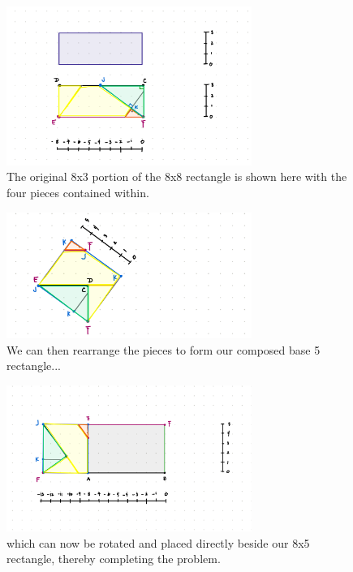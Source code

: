 \documentclass{article}
\begin{document}
\begin{figure}[ht]
    \centering
    \includegraphics[width=8cm]{Capstone Presentation/Draft Diagrams/7.png}
    \caption{The original 8x3 portion of the 8x8 rectangle is shown here with the four pieces contained within.}
    \label{Fig_Step_7}
\end{figure}

\begin{figure}[ht]
    \centering
    \includegraphics[width=8cm]{Capstone Presentation/Draft Diagrams/8.png}
    \caption{We can then rearrange the pieces to form our composed base 5 rectangle...}
    \label{Fig_Step_8}
\end{figure}

\begin{figure}[ht]
    \centering
    \includegraphics[width=8cm]{Capstone Presentation/Draft Diagrams/9.png}
    \caption{which can now be rotated and placed directly beside our 8x5 rectangle, thereby completing the problem.} 
    \label{Fig_Step_9}
\end{figure}


\FloatBarrier 
\end{document}
